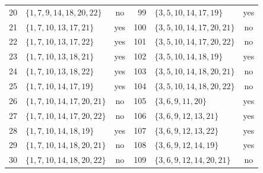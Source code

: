 \documentclass[aps,pra,reprint,superscriptaddress,longbibliography,nofootinbib,floatfix,10pt]{revtex4-2}
\theoremstyle{definition}
\begin{document}
\begin{longtable}{rlc@{\qquad}rlc}
20 & $\{1,\allowbreak 7,\allowbreak 9,\allowbreak 14,\allowbreak 18,\allowbreak 20,\allowbreak 22\}$ & no & 99 & $\{3,\allowbreak 5,\allowbreak 10,\allowbreak 14,\allowbreak 17,\allowbreak 19\}$ & yes\\
21 & $\{1,\allowbreak 7,\allowbreak 10,\allowbreak 13,\allowbreak 17,\allowbreak 21\}$ & yes & 100 & $\{3,\allowbreak 5,\allowbreak 10,\allowbreak 14,\allowbreak 17,\allowbreak 20,\allowbreak 21\}$ & no\\
22 & $\{1,\allowbreak 7,\allowbreak 10,\allowbreak 13,\allowbreak 17,\allowbreak 22\}$ & yes & 101 & $\{3,\allowbreak 5,\allowbreak 10,\allowbreak 14,\allowbreak 17,\allowbreak 20,\allowbreak 22\}$ & no\\
23 & $\{1,\allowbreak 7,\allowbreak 10,\allowbreak 13,\allowbreak 18,\allowbreak 21\}$ & yes & 102 & $\{3,\allowbreak 5,\allowbreak 10,\allowbreak 14,\allowbreak 18,\allowbreak 19\}$ & yes\\
24 & $\{1,\allowbreak 7,\allowbreak 10,\allowbreak 13,\allowbreak 18,\allowbreak 22\}$ & yes & 103 & $\{3,\allowbreak 5,\allowbreak 10,\allowbreak 14,\allowbreak 18,\allowbreak 20,\allowbreak 21\}$ & no\\
25 & $\{1,\allowbreak 7,\allowbreak 10,\allowbreak 14,\allowbreak 17,\allowbreak 19\}$ & yes & 104 & $\{3,\allowbreak 5,\allowbreak 10,\allowbreak 14,\allowbreak 18,\allowbreak 20,\allowbreak 22\}$ & no\\
26 & $\{1,\allowbreak 7,\allowbreak 10,\allowbreak 14,\allowbreak 17,\allowbreak 20,\allowbreak 21\}$ & no & 105 & $\{3,\allowbreak 6,\allowbreak 9,\allowbreak 11,\allowbreak 20\}$ & yes\\
27 & $\{1,\allowbreak 7,\allowbreak 10,\allowbreak 14,\allowbreak 17,\allowbreak 20,\allowbreak 22\}$ & no & 106 & $\{3,\allowbreak 6,\allowbreak 9,\allowbreak 12,\allowbreak 13,\allowbreak 21\}$ & yes\\
28 & $\{1,\allowbreak 7,\allowbreak 10,\allowbreak 14,\allowbreak 18,\allowbreak 19\}$ & yes & 107 & $\{3,\allowbreak 6,\allowbreak 9,\allowbreak 12,\allowbreak 13,\allowbreak 22\}$ & yes\\
29 & $\{1,\allowbreak 7,\allowbreak 10,\allowbreak 14,\allowbreak 18,\allowbreak 20,\allowbreak 21\}$ & no & 108 & $\{3,\allowbreak 6,\allowbreak 9,\allowbreak 12,\allowbreak 14,\allowbreak 19\}$ & yes\\
30 & $\{1,\allowbreak 7,\allowbreak 10,\allowbreak 14,\allowbreak 18,\allowbreak 20,\allowbreak 22\}$ & no & 109 & $\{3,\allowbreak 6,\allowbreak 9,\allowbreak 12,\allowbreak 14,\allowbreak 20,\allowbreak 21\}$ & no\\

\end{longtable}
\end{document}
